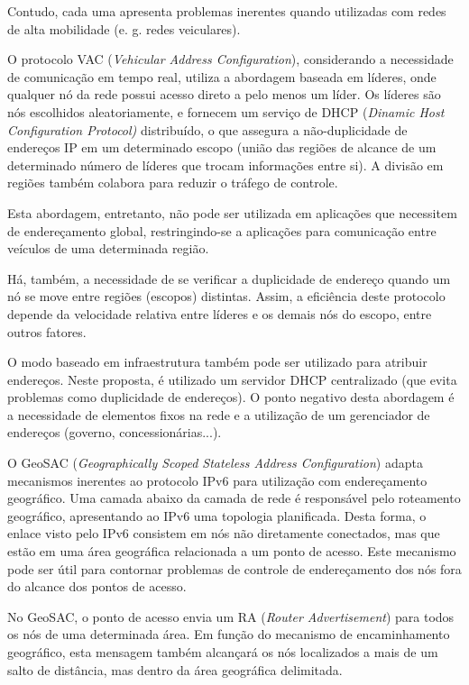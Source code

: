\documentclass[12pt,twoside,a4paper]{article}
\begin{document}
Contudo, cada uma apresenta problemas inerentes quando utilizadas com redes de alta mobilidade (e. g. redes veiculares).

O protocolo VAC (\textit{Vehicular Address Configuration}), considerando a necessidade de comunicação em tempo real, utiliza a abordagem baseada em líderes, onde qualquer nó da rede possui acesso direto a pelo menos um líder. Os líderes são nós escolhidos aleatoriamente, e fornecem um serviço de DHCP (\textit{Dinamic Host Configuration Protocol)} distribuído, o que assegura a não-duplicidade de endereços IP em um determinado escopo (união das
regiões de alcance de um determinado número de líderes que trocam informações entre
si). A divisão em regiões também colabora para reduzir o tráfego de controle.

Esta abordagem, entretanto, não pode ser utilizada em aplicações que necessitem de endereçamento global, restringindo-se a aplicações para comunicação entre veículos de uma determinada região.

Há, também, a necessidade de se verificar a duplicidade de endereço quando um nó se move entre regiões (escopos) distintas. Assim, a eficiência deste protocolo depende da velocidade relativa entre líderes e os demais nós do escopo, entre outros fatores.

O modo baseado em infraestrutura também pode ser utilizado para atribuir endereços. Neste proposta, é utilizado um servidor DHCP centralizado (que evita problemas como duplicidade de endereços). O ponto negativo desta abordagem é a necessidade de elementos fixos na rede e a utilização de um gerenciador de endereços (governo, concessionárias...).

O GeoSAC (\textit{Geographically Scoped Stateless Address Configuration}) adapta mecanismos inerentes ao protocolo IPv6 para utilização com endereçamento geográfico. Uma camada abaixo da camada de rede é responsável pelo roteamento geográfico, apresentando ao IPv6 uma topologia planificada. Desta forma, o enlace visto pelo IPv6 consistem em nós não diretamente conectados, mas que estão em uma área geográfica relacionada a um ponto de acesso. Este mecanismo pode ser útil para contornar problemas de controle de endereçamento dos nós fora do alcance dos pontos de acesso.

No GeoSAC, o ponto de acesso envia um RA (\textit{Router Advertisement}) para todos os nós de uma determinada área. Em função do mecanismo de encaminhamento geográfico, esta mensagem também alcançará os nós localizados a mais de um salto de distância, mas dentro da área geográfica delimitada.



\end{document}
